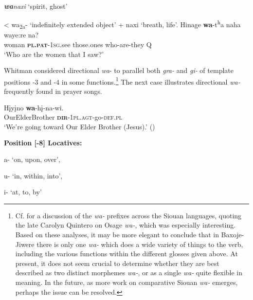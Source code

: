 \documentclass[output=paper]{LSP/langsci}
\begin{document}
\begin{exe}
\ex
\begin{xlist}
\ex \textit{\textbf{wa}naxi} `spirit, ghost' 

< wa\textsubscript{2a}- `indefinitely extended object' + naxi `breath, life'.                  	
\ex \gll Hinage   \textbf{wa}-t\textsuperscript{h}a  naha   waye:re  na?  \\           			
woman   \textbf{\textsc{pl.pat}}-\textsc{1sg.}see  those.ones who-are-they Q	\\
\trans `Who are the women that I saw?'
\end{xlist}
\end{exe}

Whitman considered directional \textit{wa}- to parallel both \textit{gra-} and \textit{gi-} of template positions -3 and -4 in some functions.\footnote{Cf. \citet{Boyle2009} for a discussion of the \textit{wa-} prefixes across the Siouan languages, quoting the late Carolyn Quintero on Osage \textit{wa-}, which was especially interesting. Based on these analyses, it may be more elegant to conclude that in Baxoje-Jiwere there is only one \textit{wa-} which does a wide variety of things to the verb, including the various functions within the different glosses given above. At present, it does not seem crucial to determine whether they are best described as two distinct morphemes \textit{wa-}, or as a single \textit{wa-} quite flexible in meaning. In the future, as more work on comparative Siouan \textit{wa-} emerges, perhaps the issue can be resolved.} The next case illustrates directional \textit{wa-} frequently found in prayer songs.	         		

\begin{exe}
\ex \gll H\k{i}y\k{i}no     \textbf{wa}-h\k{i}-na-wi. \\				      	        
OurElderBrother	  \textbf{\textsc{dir}}-1\textsc{pl.agt}-go-\textsc{def.pl} \\		           	  	        
\trans `We're going toward Our Elder Brother (Jesus).' (\citealt{Davidson1997})	
\end{exe}

\textbf{Position [-8] Locatives:}  	

\hspace{2em} a- `on, upon, over', 												

\hspace{2em} u- `in, within, into', 												

\hspace{2em} i- `at, to, by' \citep[241]{Whitman1947} 			
\end{document}
